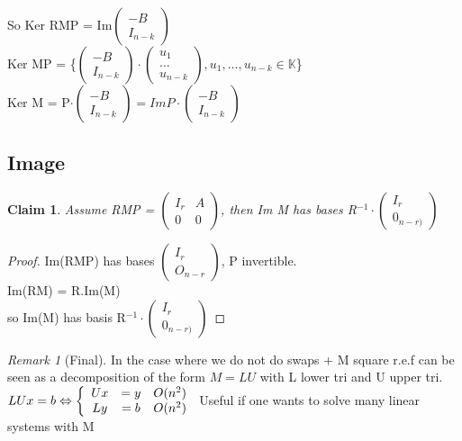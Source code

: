 \documentclass{article}
\newtheorem{claim}{Claim}
\theoremstyle{definition}
\theoremstyle{remark}
\newtheorem*{remark}{Remark}
\newcommand{\Rem}[3]{\begin{remark}[#1]\label{#2}#3\end{remark}}
\newcommand{\K}{\mathbb{K}}
\begin{document}
	So Ker RMP = Im$\begin{pmatrix}
	-B\\I_{n-k}
	\end{pmatrix}$\\
	Ker MP = \{$\begin{pmatrix}
	-B\\I_{n-k}
	\end{pmatrix}\cdot\begin{pmatrix}
	u_1\\\dots\\u_{n-k}
	\end{pmatrix}, u_1,\dots,u_{n-k}\in\K$\}\\
	Ker M = P$\cdot\begin{pmatrix}
	-B\\I_{n-k}
	\end{pmatrix} = Im P\cdot\begin{pmatrix}
	-B\\I_{n-k}
	\end{pmatrix}$
	
	\subsection{Image}
	\begin{claim}
		Assume RMP = $\begin{pmatrix}
		I_r&A\\0&0
		\end{pmatrix}$, then Im M has bases R$^{-1}\cdot\begin{pmatrix}
		I_r\\0_{n-r)}
		\end{pmatrix}$
	\end{claim}
	
	\begin{proof}
		Im(RMP) has bases $\begin{pmatrix}
		I_r\\O_{n-r}
		\end{pmatrix}$, P invertible.\\
		Im(RM) = R.Im(M)\\
		so Im(M) has basis R$^{-1}\cdot\begin{pmatrix}
		I_r\\0_{n-r)}
		\end{pmatrix}$
	\end{proof}
	
	\Rem{Final}{}{In the case where we do not do swaps + M square r.e.f can be seen as a decomposition of the form $M = LU$ with L lower tri and U upper tri.\\
		$LUx = b \Leftrightarrow \left\{\begin{array}{c c c}
		Ux & = y & O(n^2)\\
		Ly & = b & O(n^2)
		\end{array}
		\right.$ Useful if one wants to solve many linear systems with M}
	
\end{document}
